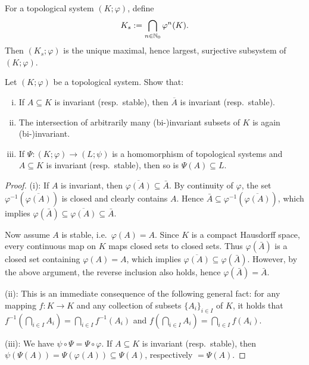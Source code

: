 \begin{corollary}
	For a topological system $(K;\varphi)$, define
	\begin{equation*}
		K_s := \bigcap_{n\in\mathbb{N}_0} \varphi^n(K).
	\end{equation*}
	Then $(K_s;\varphi)$ is the unique maximal, hence largest, surjective subsystem of $(K;\varphi)$.
\end{corollary}

\begin{exercise}[Ex.\ 2.11]
	Let $(K;\varphi)$ be a topological system. Show that:
	\begin{enumerate}[(i)]
		\item If $A \subseteq K$ is invariant (resp.\ stable), then $\overline{A}$ is invariant (resp.\ stable).
		\item The intersection of arbitrarily many (bi-)invariant subsets of $K$ is again (bi-)invariant.
		\item If $\Psi:(K;\varphi) \to (L;\psi)$ is a homomorphism of topological systems and $A \subseteq K$ is invariant (resp.\ stable), then so is $\Psi(A) \subseteq L$.
	\end{enumerate}
\end{exercise}

\begin{proof}
	(i): If $A$ is invariant, then $\overline{\varphi(A)} \subseteq \bar{A}$. By continuity of $\varphi$, the set $\varphi^{-1}(\overline{\varphi(A)})$ is closed and clearly contains $A$. Hence $\bar{A} \subseteq \varphi^{-1}(\overline{\varphi(A)})$, which implies $\varphi(\bar{A}) \subseteq \overline{\varphi(A)} \subseteq \bar{A}$.
	
	Now assume $A$ is stable, i.e.\ $\varphi(A)=A$.  Since $K$ is a compact Hausdorff space, every continuous map on $K$ maps closed sets to closed sets. Thus $\varphi(\bar{A})$ is a closed set containing $\varphi(A)=A$, which implies $\overline{\varphi(A)} \subseteq \varphi(\bar{A})$. However, by the above argument, the reverse inclusion also holds, hence $\varphi(\bar{A}) = \bar{A}$.
	
	(ii): This is an immediate consequence of the following general fact: for any mapping $f:K \to K$ and any collection of subsets $\{A_i\}_{i \in I}$ of $K$, it holds that $f^{-1}(\bigcap_{i\in I} A_i) = \bigcap_{i\in I} f^{-1}(A_i)$ and $f(\bigcap_{i\in I} A_i) = \bigcap_{i\in I} f(A_i)$.
	
	(iii): We have $\psi \circ \Psi = \Psi \circ \varphi$. If $A \subseteq K$ is invariant (resp.\ stable), then $\psi(\Psi(A)) = \Psi(\varphi(A)) \subseteq \Psi(A)$, respectively $=\Psi(A)$.
\end{proof}

